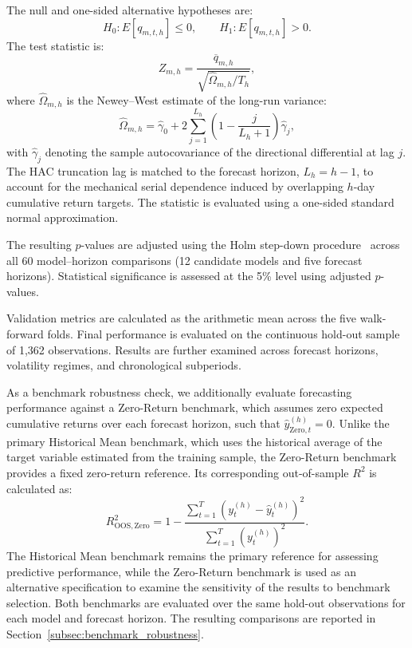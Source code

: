 \documentclass[12pt,twoside]{ord}
\begin{document}
The null and one-sided alternative hypotheses are:
\[
H_0:E[q_{m,t,h}]\leq 0,
\qquad
H_1:E[q_{m,t,h}]>0.
\]
The test statistic is:
\[
Z_{m,h}
=
\frac{\overline{q}_{m,h}}
{\sqrt{\widehat{\Omega}_{m,h}/T_h}},
\]
where $\widehat{\Omega}_{m,h}$ is the Newey--West estimate of the long-run variance:
\[
\widehat{\Omega}_{m,h}
=
\widehat{\gamma}_0
+
2\sum_{j=1}^{L_h}
\left(1-\frac{j}{L_h+1}\right)
\widehat{\gamma}_j,
\]
with $\widehat{\gamma}_j$ denoting the sample autocovariance of the directional differential at lag $j$. The HAC truncation lag is matched to the forecast horizon, $L_h=h-1$, to account for the mechanical serial dependence induced by overlapping $h$-day cumulative return targets. The statistic is evaluated using a one-sided standard normal approximation.

The resulting $p$-values are adjusted using the Holm step-down procedure~\cite{holm1979} across all 60 model--horizon comparisons (12 candidate models and five forecast horizons). Statistical significance is assessed at the 5\% level using adjusted $p$-values.

Validation metrics are calculated as the arithmetic mean across the five walk-forward folds. Final performance is evaluated on the continuous hold-out sample of 1,362 observations. Results are further examined across forecast horizons, volatility regimes, and chronological subperiods.

As a benchmark robustness check, we additionally evaluate forecasting performance against a Zero-Return benchmark, which assumes zero expected cumulative returns over each forecast horizon, such that \(\hat{y}^{(h)}_{\mathrm{Zero},t}=0\). Unlike the primary Historical Mean benchmark, which uses the historical average of the target variable estimated from the training sample, the Zero-Return benchmark provides a fixed zero-return reference. Its corresponding out-of-sample \(R^2\) is calculated as:
\begin{equation}
R^2_{\mathrm{OOS,Zero}} = 1 - \frac{\sum_{t=1}^{T}\left(y_t^{(h)}-\hat{y}_t^{(h)}\right)^2}{\sum_{t=1}^{T}\left(y_t^{(h)}\right)^2}.
\end{equation}
The Historical Mean benchmark remains the primary reference for assessing predictive performance, while the Zero-Return benchmark is used as an alternative specification to examine the sensitivity of the results to benchmark selection. Both benchmarks are evaluated over the same hold-out observations for each model and forecast horizon. The resulting comparisons are reported in Section~\ref{subsec:benchmark_robustness}.
\end{document}
